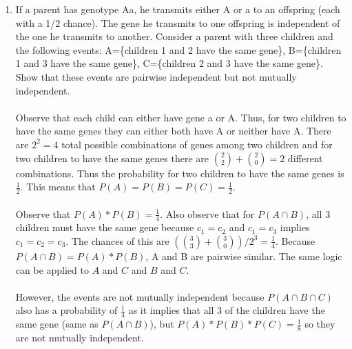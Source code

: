 \documentclass{article}
\newcommand{\intersect}{\cap}
\begin{document}
\begin{enumerate}
\begin{enumerate}
        \end{enumerate}
\pagebreak
        \item If a parent has genotype Aa, he transmits either A or a to an offspring (each with a 1/2 chance). The gene he transmits to one offspring is independent of the one he transmits to another. Consider a parent with three children and the following events: A=\{children 1 and 2 have the same gene\}, B=\{children 1 and 3 have the same gene\}, C=\{children 2 and 3 have the same gene\}. Show that these events are pairwise independent but not mutually independent.\\\\
        Observe that each child can either have gene a or A. Thus, for two children to have the same genes they can either both have A or neither have A. There are $2^2=4$ total possible combinations of genes among two children and for two children to have the same genes there are $\binom{2}{2} + \binom{2}{0} = 2$ different combinations. Thus the probability for two children to have the same genes is $\frac{1}{2}$. This means that $P(A)=P(B)=P(C)=\frac{1}{2}$. \\\\
        Observe that $P(A)*P(B)=\frac{1}{4}$. Also observe that for $P(A \intersect B)$, all 3 children must have the same gene because $c_1=c_2$ and $c_1=c_3$ implies $c_1=c_2=c_3$. The chances of this are $(\binom{3}{3} + \binom{3}{0})/2^3=\frac{1}{4}$. Because $P(A \intersect B) = P(A)*P(B)$, A and B are pairwise similar. The same logic can be applied to $A$ and $C$ and $B$ and $C$.\\\\
        However, the events are not mutually independent because $P(A \intersect B \intersect C)$ also has a probability of $\frac{1}{4}$ as it implies that all 3 of the children have the same gene (same as $P(A \intersect B)$), but $P(A)*P(B)*P(C)=\frac{1}{8}$ so they are not mutually independent.
        

\end{enumerate}
\end{document}
